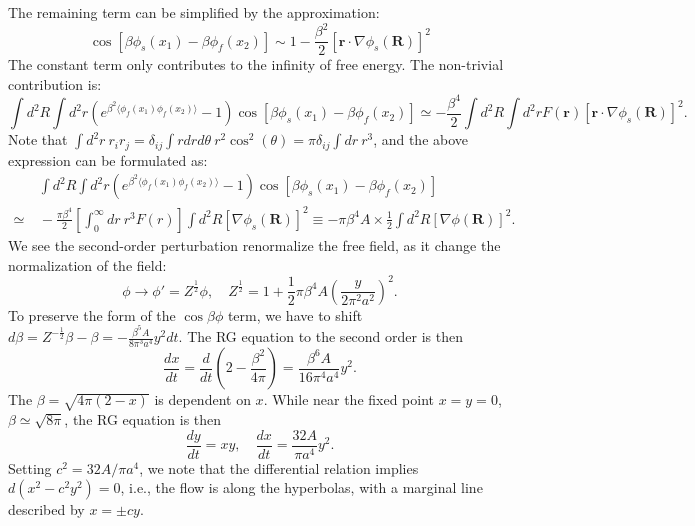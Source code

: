 \documentclass[aps,prb,superscriptaddress,nofootinbib]{revtex4}
\begin{document}
The remaining term can be simplified by the approximation:
\begin{equation*}
	\cos\left[\beta\phi_s(x_1) -\beta\phi_f(x_2)\right]
	\sim 1-\frac{\beta^2}{2} [\bm r \cdot \nabla\phi_s(\bm R)]^2
\end{equation*}
The constant term only contributes to the infinity of free energy.
The non-trivial contribution is:
\begin{equation*}
	\int d^2 R \int d^2 r \left(e^{\beta^2 \langle\phi_f(x_1)\phi_f(x_2)\rangle}-1 \right)\cos\left[\beta\phi_s(x_1) -\beta\phi_f(x_2)\right] 
	\simeq  -\frac{\beta^4}{2} \int d^2 R \int d^2r F(\bm r) [\bm r \cdot \nabla\phi_s(\bm R)]^2.
\end{equation*}
Note that $\int d^2r\ r_i r_j = \delta_{ij} \int r dr d\theta\ r^2 \cos^2(\theta) = \pi \delta_{ij} \int dr\ r^3$, and the above expression can be formulated as:
\begin{equation*}
\begin{aligned}
	&\ \int d^2 R \int d^2 r \left(e^{\beta^2 \langle\phi_f(x_1)\phi_f(x_2)\rangle}-1 \right)\cos\left[\beta\phi_s(x_1) -\beta\phi_f(x_2)\right] \\
	\simeq &\ -\frac{\pi \beta^4}{2} \left[\int_0^\infty dr\ r^3 F(r)\right] \int d^2 R [\nabla\phi_s(\bm R)]^2 
	\equiv  -\pi \beta^4 A \times \frac{1}{2}\int d^2 R [\nabla\phi(\bm R)]^2.
\end{aligned}
\end{equation*}
We see the second-order perturbation renormalize the free field, as it change the normalization of the field:
\begin{equation*}
	\phi \rightarrow \phi' = Z^{\frac{1}{2}} \phi, \quad 
	Z^{\frac{1}{2}} = 1 +\frac{1}{2} \pi \beta^4 A \left( \frac{y}{2\pi^2 a^2} \right)^2.
\end{equation*}
To preserve the form of the $\cos\beta\phi$ term, we have to shift $d\beta = Z^{-\frac{1}{2}}\beta - \beta = -\frac{\beta^5 A}{8 \pi^3 a^4} y^2 dt$.
The RG equation to the second order is then
\begin{equation*}
	\frac{dx}{dt} = \frac{d}{dt}\left(2-\frac{\beta^2}{4\pi}\right)
	= \frac{\beta^6 A}{16\pi^4 a^4} y^2.
\end{equation*}
The $\beta = \sqrt{4\pi(2-x)}$ is dependent on $x$.
While near the fixed point $x=y=0$, $\beta \simeq \sqrt{8\pi}$, the RG equation is then
\begin{equation}
	\frac{dy}{dt} = xy, \quad
	\frac{dx}{dt} = \frac{32 A}{\pi a^4} y^2.
\end{equation}
Setting $c^2 = 32A/\pi a^4$, we note that the differential relation implies $d(x^2- c^2 y^2) = 0$, i.e., the flow is along the hyperbolas, with a marginal line described by $x = \pm cy$.
\end{document}
